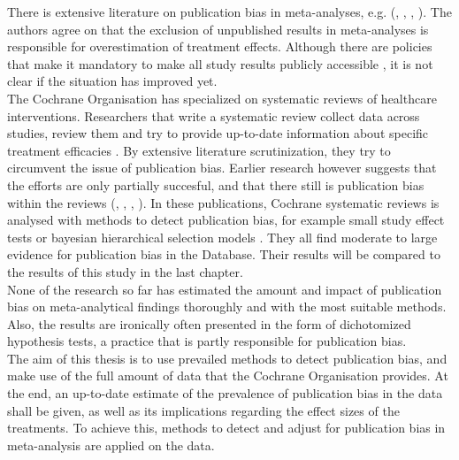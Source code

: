 \documentclass[11pt,a4paper,twoside]{book}\usepackage[]{graphicx}\usepackage[]{color}
\begin{document}
There is extensive literature on publication bias in meta-analyses, e.g. (\citet{pb.clinicalscience.2013}, %
\citet{grey.literature.4}, \citet{grey.literature.3}, \citet{grey.literature.2}).
The authors agree on that the exclusion of unpublished results in meta-analyses is responsible for overestimation of treatment effects. Although there are policies that make it mandatory to make all study results publicly accessible \citep{fda}, it is not clear if the situation has improved yet.\\
The Cochrane Organisation has specialized on systematic reviews of healthcare interventions. Researchers that write a systematic review collect data across studies, review them and try to provide up-to-date information about specific treatment efficacies \citep{cochrane.handbook}. By extensive literature scrutinization, they try to circumvent the issue of publication bias. Earlier research however suggests that the efforts are only partially succesful, and that there still is publication bias within the reviews (\citet{Egger}, \citet{Ioannidis2007}, \citet{kicinsky}, \citet{vanAert.2019}). In these publications, Cochrane systematic reviews is analysed with methods to detect publication bias, for example small study effect tests or bayesian hierarchical selection models \citep{kicinsky}. They all find moderate to large evidence for publication bias in the Database. Their results will be compared to the results of this study in the last chapter.\\
None of the research so far has estimated the amount and impact of publication bias on meta-analytical findings thoroughly and with the most suitable methods. Also, the results are ironically often presented in the form of dichotomized hypothesis tests, a practice that is partly responsible for publication bias.\\
The aim of this thesis is to use prevailed methods to detect publication bias, and make use of the full amount of data that the Cochrane Organisation provides. At the end, an up-to-date estimate of the prevalence of publication bias in the data shall be given, as well as its implications regarding the effect sizes of the treatments. To achieve this, methods to detect and adjust for publication bias in meta-analysis are applied on the data.
\end{document}

